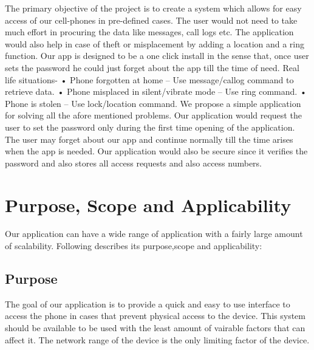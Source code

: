 \hspace{0.9cm} The primary objective of the project is to create a system which allows for easy access of our cell-phones in pre-defined cases. The user would not need to take much effort in procuring the data like messages, call logs etc. The application would also help in case of theft or misplacement by adding a location and a ring function.
Our app is designed to be a one click install in the sense that, once user sets the password he could just forget about the app till the time of need.
Real life situations-
•	Phone forgotten at home – Use message/callog command to retrieve data.
•	Phone misplaced in silent/vibrate mode – Use ring command.
•	Phone is stolen – Use lock/location command.
We propose a simple application for solving all the afore mentioned problems. Our application would request the user to set the password only during the first time opening of the application. The user may forget about our app and continue normally till the time arises when the app is needed. Our application would also be secure since it verifies the password and also stores all access requests and also access numbers.

\section{Purpose, Scope and Applicability}

\hspace{0.9cm} Our application can have a wide range of application with a fairly large amount of scalability.
Following describes its purpose,scope and applicability:

\subsection{Purpose}
\hspace{0.9cm}
 The goal of our application is to provide a quick and easy to use interface to access the phone in cases that prevent physical access to the device. This system should be available to be used with the least amount of vairable factors that can affect it. The network range of the device is the only limiting factor of the device. 
 
